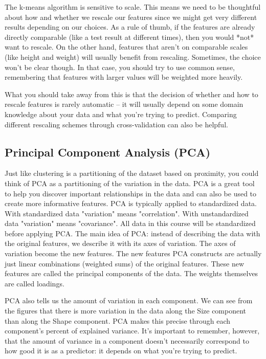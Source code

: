 \documentclass[12pt]{report}
\begin{document}
The k-means algorithm is sensitive to scale. This means we need to be thoughtful about how and whether we rescale our features since we might get very different results depending on our choices. As a rule of thumb, if the features are already directly comparable (like a test result at different times), then you would *not* want to rescale. On the other hand, features that aren't on comparable scales (like height and weight) will usually benefit from rescaling. Sometimes, the choice won't be clear though. In that case, you should try to use common sense, remembering that features with larger values will be weighted more heavily.

What you should take away from this is that the decision of whether and how to rescale features is rarely automatic -- it will usually depend on some domain knowledge about your data and what you're trying to predict. Comparing different rescaling schemes through cross-validation can also be helpful.




\subsection{Principal Component Analysis (PCA)}
Just like clustering is a partitioning of the dataset based on proximity, you could think of PCA as a partitioning of the variation in the data. PCA is a great tool to help you discover important relationships in the data and can also be used to create more informative features. PCA is typically applied to standardized data. With standardized data "variation" means "correlation". With unstandardized data "variation" means "covariance". All data in this course will be standardized before applying PCA. The main idea of PCA: instead of describing the data with the original features, we describe it with its axes of variation. The axes of variation become the new features. The new features PCA constructs are actually just linear combinations (weighted sums) of the original features. These new features are called the principal components of the data. The weights themselves are called loadings.

PCA also tells us the amount of variation in each component. We can see from the figures that there is more variation in the data along the Size component than along the Shape component. PCA makes this precise through each component's percent of explained variance. It's important to remember, however, that the amount of variance in a component doesn't necessarily correspond to how good it is as a predictor: it depends on what you're trying to predict.
\end{document}

